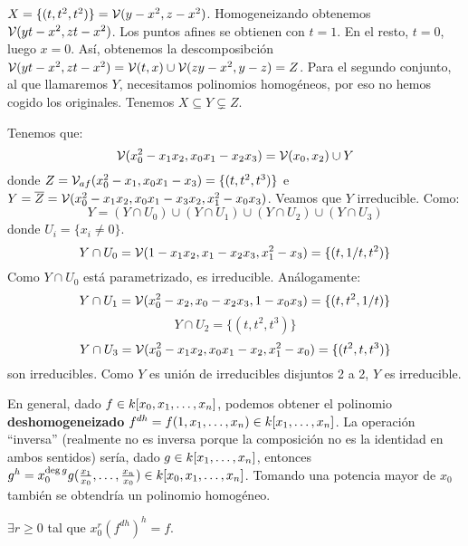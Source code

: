 \documentclass[ACGA.tex]{subfiles}
\begin{document}
\begin{ej}
$X=\{(t,t^2,t^2)\}=\mathcal{V}(y-x^2,z-x^2)$. Homogeneizando obtenemos $\mathcal{V}(yt-x^2,zt-x^2)$. Los puntos afines se obtienen con $t=1$. En el resto, $t=0$, luego $x=0$. Así, obtenemos la descomposibción $\mathcal{V}(yt-x^2,zt-x^2)=\mathcal{V}(t,x)\cup\mathcal{V}(zy-x^2,y-z)=Z$. Para el segundo conjunto, al que llamaremos $Y$, necesitamos polinomios homogéneos, por eso no hemos cogido los originales. Tenemos $X\subseteq Y\subsetneq Z$. 

Tenemos que:
\[ \mathcal{V}(x_0^2-x_1x_2, x_0x_1-x_2x_3) = \mathcal{V}(x_0,x_2) \cup Y \]
donde $Z=\mathcal{V}_{af}(x_0^2-x_1,x_0x_1-x_3) = \{(t,t^2,t^3)\}$ e $Y=\overline{Z}=\mathcal{V}(x_0^2-x_1x_2,x_0x_1-x_3x_2,x_1^2-x_0x_3)$. Veamos que $Y$ irreducible. Como:
\[ Y = (Y \cap U_0) \cup (Y \cap U_1) \cup (Y \cap U_2) \cup (Y \cap U_3) \]
donde $U_i = \{x_i \neq 0\}$.
\[ Y \cap U_0 = \mathcal{V}(1-x_1x_2,x_1-x_2x_3,x_1^2-x_3) = \{(t,1/t,t^2)\} \]
Como $Y \cap U_0$ está parametrizado, es irreducible. Análogamente:
\[ Y \cap U_1 = \mathcal{V}(x_0^2-x_2,x_0-x_2x_3,1-x_0x_3) = \{(t,t^2,1/t)\} \]
\[ Y \cap U_2 = \{(t,t^2,t^3)\} \]
\[ Y \cap U_3 = \mathcal{V}(x_0^2-x_1x_2, x_0x_1-x_2, x_1^2-x_0) = \{(t^2,t,t^3)\} \]
son irreducibles. Como $Y$ es unión de irreducibles disjuntos 2 a 2, $Y$ es irreducible.
\end{ej}

\begin{nota}
En general, dado $f\in k[x_0,x_1,\dotsc,x_{n}]$, podemos obtener el polinomio \textbf{deshomogeneizado} $f^{dh}=f(1,x_1,\dots,x_n)\in k[x_1,\dotsc,x_{n}]$. La operación ``inversa'' (realmente no es inversa porque la composición no es la identidad en ambos sentidos) sería, dado $g\in k[x_1,\dotsc,x_{n}]$, entonces $g^h=x_0^{\deg{g}}g(\frac{x_1}{x_0},\dots,\frac{x_n}{x_0})\in k[x_0,x_1,\dotsc,x_{n}]$. Tomando una potencia mayor de $x_0$ también se obtendría un polinomio homogéneo. 
\end{nota}

\begin{ejer}
$\exists r\geq 0$ tal que $x_0^r(f^{dh})^h=f$.
\end{ejer}
\end{document}
